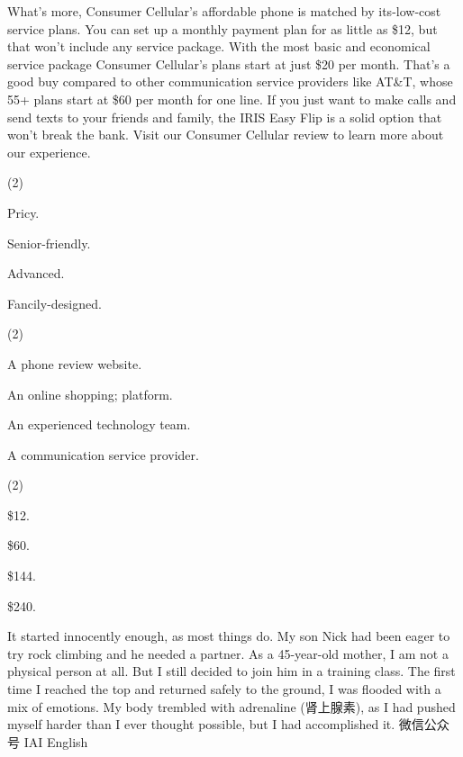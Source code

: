 \documentclass{英语试卷}
\begin{document}
\par What's more, Consumer Cellular's affordable phone is matched by its-low-cost service plans. You can set up a monthly payment plan for as little as \$12, but that won't include any service package. With the most basic and economical service package Consumer Cellular's plans start at just \$20 per month. That's a good buy compared to other communication service providers like AT\&T, whose 55+ plans start at \$60 per month for one line. If you just want to make calls and send texts to your friends and family, the IRIS Easy Flip is a solid option that won't break the bank. Visit our Consumer Cellular review to learn more about our experience.\par
{}
\begin{choices}(2)
  \item Pricy.
  \item Senior-friendly.
  \item Advanced.
  \item Fancily-designed.
\end{choices}
\begin{choices}(2)
  \item A phone review website.
  \item An online shopping; platform.
  \item An experienced technology team.
  \item A communication service provider.
\end{choices}
\begin{choices}(2)
  \item \$12.
  \item \$60.
  \item \$144.
  \item \$240.
\end{choices}
\par It started innocently enough, as most things do. My son Nick had been eager to try rock climbing and he needed a partner. As a 45-year-old mother, I am not a physical person at all. But I still decided to join him in a training class. The first time I reached the top and returned safely to the ground, I was flooded with a mix of emotions. My body trembled with adrenaline (肾上腺素), as I had pushed myself harder than I ever thought possible, but I had accomplished it. 微信公众号 IAI English\par
\end{document}

